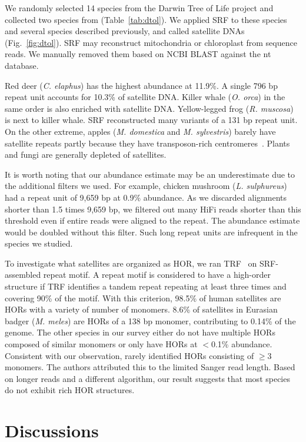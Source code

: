 \documentclass{bioinfo}
\begin{document}
We randomly selected 14 species from the Darwin Tree of Life project and
collected two species from \citet{Hon:2020aa} (Table~\ref{tab:dtol}). We applied
SRF to these species and several species described previously, and called satellite DNAs (Fig.~\ref{fig:dtol}).
SRF may reconstruct mitochondria or chloroplast from sequence reads.
We manually removed them based on NCBI BLAST against the nt database.

Red deer (\emph{C. elaphus}) has the highest abundance at 11.9\%. A single
796 bp repeat unit accounts for 10.3\% of satellite DNA. Killer whale (\emph{O.
orca}) in the same order is also enriched with satellite DNA. Yellow-legged
frog (\emph{R. muscosa}) is next to killer whale. SRF reconstructed many
variants of a 131 bp repeat unit. On the other extreme, apples (\emph{M.
domestica} and \emph{M. sylvestris}) barely have satellite repeats partly
because they have transposon-rich centromeres~\citep{Zhang:2019ab}. Plants and
fungi are generally depleted of satellites.

It is worth noting that our abundance estimate may be an underestimate due to
the additional filters we used. For example, chicken mushroom (\emph{L.
sulphureus}) had a repeat unit of 9,659 bp at 0.9\% abundance. As we discarded
alignments shorter than 1.5 times 9,659 bp, we filtered out many HiFi reads
shorter than this threshold even if entire reads were aligned to the repeat.
The abundance estimate would be doubled without this filter. Such long repeat
units are infrequent in the species we studied.

To investigate what satellites are organized as HOR, we ran
TRF~\citep{Benson:1999aa} on SRF-assembled repeat motif. A repeat motif is
considered to have a high-order structure if TRF identifies a tandem repeat
repeating at least three times and covering 90\% of the motif. With this
criterion, 98.5\% of human satellites are HORs with a variety of number of
monomers. 8.6\% of satellites in Eurasian badger (\emph{M. meles}) are HORs of
a 138 bp monomer, contributing to 0.14\% of the genome. The other species in
our survey either do not have multiple HORs composed of similar monomers or
only have HORs at $<$0.1\% abundance. Consistent with our observation,
\citet{Melters:2013va} rarely identified HORs consisting of $\ge$3 monomers.
The authors attributed this to the limited Sanger read length. Based on longer
reads and a different algorithm, our result suggests that most species do not
exhibit rich HOR structures.

\section{Discussions}
\end{document}
